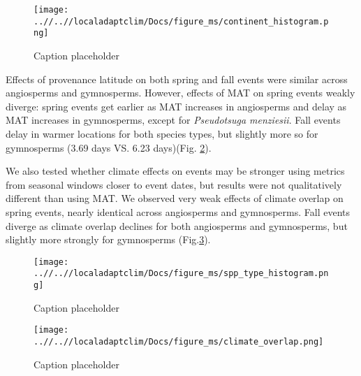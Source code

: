 \documentclass{article}
\begin{document}
\begin{figure}[!h] 
    \centering
 \texttt{[image: ..//..//localadaptclim/Docs/figure\_ms/continent\_histogram.png]}
    \caption{Caption placeholder}
    \label{figure:continent}
\end{figure}

Effects of provenance latitude on both spring and fall events were similar across angiosperms and gymnosperms. However, effects of MAT on spring events weakly diverge: spring events get earlier as MAT increases in angiosperms and delay as MAT increases in gymnosperms, except for \emph{Pseudotsuga menziesii}. Fall events delay in warmer locations for both species types, but slightly more so for gymnosperms (3.69 days VS. 6.23 days)(Fig. \ref{figure:spp_type}).


We also tested whether climate effects on events may be stronger using metrics from seasonal windows closer to event dates, but results were not qualitatively different than using MAT. We observed very weak effects of climate overlap on spring events, nearly identical across angiosperms and gymnosperms. Fall events diverge as climate overlap declines for both angiosperms and gymnosperms, but slightly more strongly for gymnosperms (Fig.\ref{figure:overlap}).

\begin{figure}[!h] 
    \centering
 \texttt{[image: ..//..//localadaptclim/Docs/figure\_ms/spp\_type\_histogram.png]}
    \caption{Caption placeholder}
    \label{figure:spp_type}
\end{figure}


\begin{figure}[!h] 
    \centering
 \texttt{[image: ..//..//localadaptclim/Docs/figure\_ms/climate\_overlap.png]}
    \caption{Caption placeholder}
    \label{figure:overlap}
\end{figure}



\end{document}
